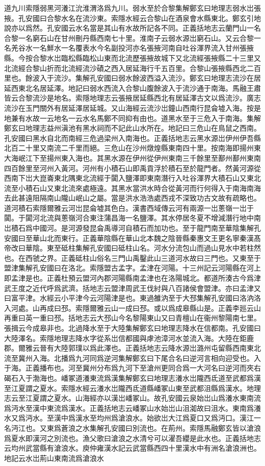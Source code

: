 道九川索隱弱黑河瀁江沇淮渭洛爲九川。弱水至於合黎集解鄭玄曰地理志弱水岀張掖。孔安國曰合黎水名在流沙東。索隱水經云合黎山在酒泉會水縣東北。鄭玄引地說亦以爲然。孔安國云水名當是其山有水故所記各不同。正義括地志云蘭門山一名合黎一名窮石山在甘州刪丹縣西南七十里。淮南子云弱水源岀窮石山。又云合黎一名羌谷水一名鮮水一名覆表水今名副投河亦名張掖河南自吐谷渾界流入甘州張掖縣。今按合黎水岀臨松縣臨松山東而北流歷張掖故城下又北流經張掖縣二十三里又北流經合黎山折而北流經流沙磧之西入居延海行千五百里。合黎山張掖縣西北二百里也。餘波入于流沙。集解孔安國曰弱水餘波西溢入流沙。鄭玄曰地理志流沙在居延西東北名居延澤。地記曰弱水西流入合黎山腹餘波入于流沙通于南海。馬融王肅皆云合黎流沙是地名。索隱地理志云張掖居延縣西北有居延澤古文以爲流沙。廣志流沙在玉門關外有居延澤居延城。又山海經云流沙岀鐘山西南行昆侖墟入海。按是地兼有水故一云地名一云水名馬鄭不同抑有由也。道黑水至于三危入于南海。集解鄭玄曰地理志益州滇池有黑水祠而不記此山水所在。地記曰三危山在鳥鼠之西南。孔安國曰黑水自北而南經三危過梁州入南海也。正義括地志云黑水源岀伊州伊吾縣北百二十里又南流二千里而絕。三危山在沙州燉煌縣東南四十里。按南海即揚州東大海岷江下至揚州東入海也。其黑水源在伊州從伊州東南三千餘里至鄯州鄯州東南四百餘里至河州入黃河。河州有小積石山即禹貢浮於積石至於龍門者。然黃河源從西南下岀大崑崙東北隅東北流經于闐入鹽澤即東南潛行入吐谷渾界大積石山又東北流至小積石山又東北流來處極遠。其黑水當洪水時合從黃河而行何得入于南海南海去此甚遠阻隔南山隴山岷山之屬。當是洪水浩浩處西戎不深致功古文故有疏略也。道河積石索隱爾雅云河岀昆侖墟其色白。漢書西域傳云河有兩源一岀蔥嶺一岀于闐。于闐河北流與蔥嶺河合東注蒲昌海一名鹽澤。其水停居冬夏不增減潛行地中南岀積石爲中國河。是河源發昆侖禹導河自積石而加功也。至于龍門南至華陰集解孔安國曰至華山北而東行。正義華陰縣在華山北本魏之陰晉縣秦惠文王更名寧秦漢髙帝改曰華陰。東至砥柱集解孔安國曰砥柱山名。河水分流包山而過山見水中若柱然也。在西虢之界。正義砥柱山俗名三門山禹鑿此山三道河水故曰三門也。又東至于盟津集解孔安國曰在洛北。索隱盟古孟字。孟津在河陽。十三州記云河陽縣在河上即孟津是也。正義杜預云盟河內郡河陽縣南孟津也在洛陽城北。都道所湊古今爲津武王度之近代呼爲武濟。括地志云盟津周武王伐紂與八百諸侯會盟津。亦曰孟津又曰富平津。水經云小平津今云河陽津是也。東過雒汭至于大邳集解孔安國曰洛汭洛入河處。山再成曰邳。索隱爾雅云山一成曰邳。或以爲成皋縣山是。正義李廵云山再重曰英一重曰邳。括地志云大邳山今名黎陽東山又曰青檀山在衞州黎陽南七里。張揖云今成皋非也。北過降水至于大陸集解鄭玄曰地理志降水在信都南。孔安國曰大陸澤名。索隱地理志降水字從系岀信都國與虖池漳河水並流入海。大陸在鉅鹿郡。爾雅云晉有大陸郭璞以爲此澤也。正義括地志云降水源岀潞州屯留縣西南東北流至冀州入海。北播爲九河同爲逆河集解鄭玄曰下尾合名曰逆河言相向迎受也。入于海。正義播布也。河至冀州分布爲九河下至滄州更同合爲一大河名曰逆河而夾右碣石入于渤海也。嶓冢道瀁東流爲漢集解鄭玄曰地理志瀁水岀隴西氐道至武都爲漢至江夏謂之夏水。索隱水經云瀁水岀隴西氐道縣嶓冢山東至武都沮縣爲漢水。地理志云至江夏謂之夏水。山海經亦以漢岀嶓冢山。故孔安國云泉始岀山爲瀁水東南流爲沔水至漢中東流爲漢水。正義括地志云嶓冢山水始岀山沮洳故曰沮水。東南爲瀁水又爲沔水。至漢中爲漢水至均州爲滄浪水。始欲岀大江爲夏口又爲沔口。漢江一名沔江也。又東爲蒼浪之水集解孔安國曰別流也。在荊州。索隱馬融鄭玄皆以滄浪爲夏水即漢河之別流也。漁父歌曰滄浪之水清兮可以濯吾纓是此水也。正義括地志云均州武當縣有滄浪水。庾仲雍漢水記云武當縣西四十里漢水中有洲名滄浪洲也。地記云水岀荊山東南流爲滄浪水